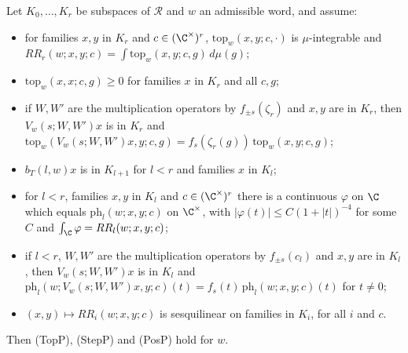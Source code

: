 \begin{proposition}\label{pf:sh-curv:thmPsteps}
Let $K_0,\dots,K_r$ be subspaces of $\mathcal R$ and $w$ an admissible word, and assume:
\begin{itemize}
\item[(TI)] for families $x,y$ in $K_r$ and $c\in(\C^\times)^r$, $\mathrm{top}_w(x,y;c,\cdot)$ is $\mu$-integrable and
$RR_r(w;x,y;c)=\int\mathrm{top}_w(x,y;c,g)\,d\mu(g)$;
\item[(TN)] $\mathrm{top}_w(x,x;c,g)\ge0$ for families $x$ in $K_r$ and all $c,g$;
\item[(TT)] if $W,W'$ are the multiplication operators by $f_{\pm s}(\zeta_r)$ and $x,y$ are in $K_r$, then $V_w(s;W,W')x$
is in $K_r$ and $\mathrm{top}_w(V_w(s;W,W')x,y;c,g)=f_s(\zeta_r(g))\,\mathrm{top}_w(x,y;c,g)$;
\item[(SI)] $b_T(l,w)x$ is in $K_{l+1}$ for $l<r$ and families $x$ in $K_l$;
\item[(SD)] for $l<r$, families $x,y$ in $K_l$ and $c\in(\C^\times)^r$ there is a continuous $\varphi$ on $\C$ which equals
$\mathrm{ph}_l(w;x,y;c)$ on $\C^\times$, with $|\varphi(t)|\le C(1+|t|)^{-4}$ for some $C$ and $\int_\C\varphi=RR_l(w;x,y;c)$;
\item[(ST)] if $l<r$, $W,W'$ are the multiplication operators by $f_{\pm s}(c_l)$ and $x,y$ are in $K_l$, then $V_w(s;W,W')x$
is in $K_l$ and $\mathrm{ph}_l(w;V_w(s;W,W')x,y;c)(t)=f_s(t)\,\mathrm{ph}_l(w;x,y;c)(t)$ for $t\ne0$;
\item[(FS)] $(x,y)\mapsto RR_i(w;x,y;c)$ is sesquilinear on families in $K_i$, for all $i$ and $c$.
\end{itemize}
Then (TopP), (StepP) and (PosP) hold for $w$.
\end{proposition}

